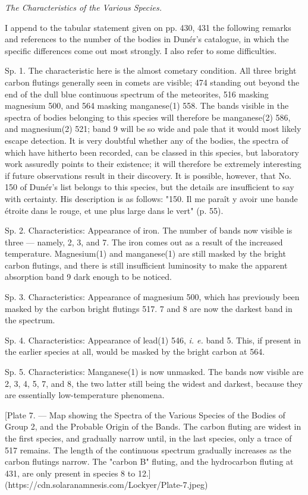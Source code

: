 \documentclass[a4paper, 12pt, oneside, polutonikogreek, english]{article}
\begin{document}
\emph{The Characteristics of the Various Species.}

I append to the tabular statement given on pp. 430, 431 the following remarks and references to the number of the bodies in Dunér's catalogue, in which the specific differences come out most strongly. I also refer to some difficulties.

Sp. 1. The characteristic here is the almost cometary condition. All three bright carbon flutings generally seen in comets are visible; 474 standing out beyond the end of the dull blue continuous spectrum of the meteorites, 516 masking magnesium 500, and 564 masking manganese(1) 558. The bands visible in the spectra of bodies belonging to this species will therefore be manganese(2) 586, and magnesium(2) 521; band 9 will be so wide and pale that it would most likely escape detection. It is very doubtful whether any of the bodies, the spectra of which have hitherto been recorded, can be classed in this species, but laboratory work assuredly points to their existence; it will therefore be extremely interesting if future observations result in their discovery. It is possible, however, that No. 150 of Dunér's list belongs to this species, but the details are insufficient to say with certainty. His description is as follows: "150. Il me paraît y avoir une bande étroite dans le rouge, et une plus large dans le vert" (p. 55).

Sp. 2. Characteristics: Appearance of iron. The number of bands now visible is three --- namely, 2, 3, and 7. The iron comes out as a result of the increased temperature. Magnesium(1) and manganese(1) are still masked by the bright carbon flutings, and there is still insufficient luminosity to make the apparent absorption band 9 dark enough to be noticed.

Sp. 3. Characteristics: Appearance of magnesium 500, which has previously been masked by the carbon bright flutings 517. 7 and 8 are now the darkest band in the spectrum.

Sp. 4. Characteristics: Appearance of lead(1) 546, \emph{i. e.} band 5. This, if present in the earlier species at all, would be masked by the bright carbon at 564.

Sp. 5. Characteristics: Manganese(1) is now unmasked. The bands now visible are 2, 3, 4, 5, 7, and 8, the two latter still being the widest and darkest, because they are essentially low-temperature phenomena.

[Plate 7. --- Map showing the Spectra of the Various Species of the Bodies of Group 2, and the Probable Origin of the Bands. The carbon fluting are widest in the first species, and gradually narrow until, in the last species, only a trace of 517 remains. The length of the continuous spectrum gradually increases as the carbon flutings narrow. The "carbon B" fluting, and the hydrocarbon fluting at 431, are only present in species 8 to 12.](https://cdn.solaranamnesis.com/Lockyer/Plate-7.jpeg)
\end{document}
